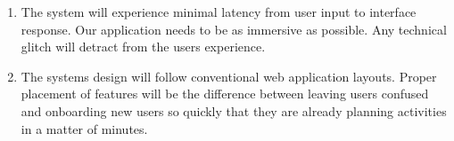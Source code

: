 \begin{enumerate}
\begin{enumerate}
\begin{enumerate}
\item The system will experience minimal latency from user input to interface response. Our application needs to be as immersive as possible. Any technical glitch will detract from the user\textsc{}s experience.
\item The systems design will follow conventional web application layouts. Proper placement of features will be the difference between leaving users confused and onboarding new users so quickly that they are already planning activities in a matter of minutes.
\end{enumerate}
\end{enumerate}
\end{enumerate}